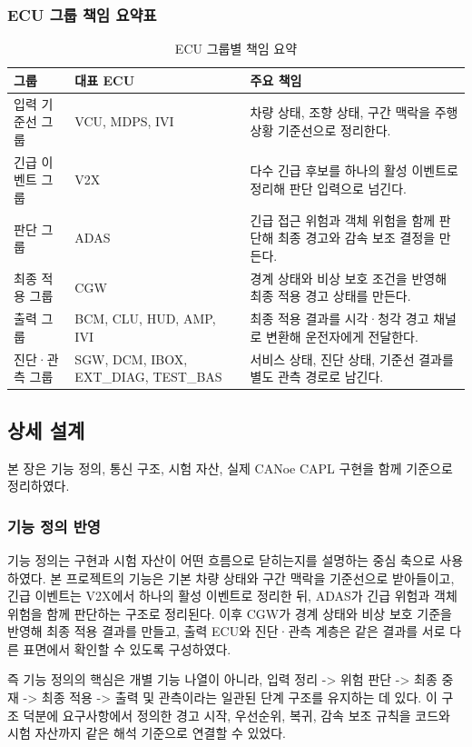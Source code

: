 \documentclass[11pt,a4paper]{article}
\begin{document}
\subsubsection{ECU 그룹 책임 요약표}
\begin{table}[H]
\centering
\begin{tabularx}{\textwidth}{|p{28mm}|p{24mm}|X|}
\hline
\textbf{그룹} & \textbf{대표 ECU} & \textbf{주요 책임} \\ \hline
입력 기준선 그룹 & VCU, MDPS, IVI & 차량 상태, 조향 상태, 구간 맥락을 주행 상황 기준선으로 정리한다. \\ \hline
긴급 이벤트 그룹 & V2X & 다수 긴급 후보를 하나의 활성 이벤트로 정리해 판단 입력으로 넘긴다. \\ \hline
판단 그룹 & ADAS & 긴급 접근 위험과 객체 위험을 함께 판단해 최종 경고와 감속 보조 결정을 만든다. \\ \hline
최종 적용 그룹 & CGW & 경계 상태와 비상 보호 조건을 반영해 최종 적용 경고 상태를 만든다. \\ \hline
출력 그룹 & BCM, CLU, HUD, AMP, IVI & 최종 적용 결과를 시각·청각 경고 채널로 변환해 운전자에게 전달한다. \\ \hline
진단·관측 그룹 & SGW, DCM, IBOX, EXT\_DIAG, TEST\_BAS & 서비스 상태, 진단 상태, 기준선 결과를 별도 관측 경로로 남긴다. \\ \hline
\end{tabularx}
\caption{ECU 그룹별 책임 요약}
\end{table}

\subsection{상세 설계}
본 장은 기능 정의, 통신 구조, 시험 자산, 실제 CANoe CAPL 구현을 함께 기준으로 정리하였다.

\subsubsection{기능 정의 반영}
기능 정의는 구현과 시험 자산이 어떤 흐름으로 닫히는지를 설명하는 중심 축으로 사용하였다. 본 프로젝트의 기능은 기본 차량 상태와 구간 맥락을 기준선으로 받아들이고, 긴급 이벤트는 V2X에서 하나의 활성 이벤트로 정리한 뒤, ADAS가 긴급 위험과 객체 위험을 함께 판단하는 구조로 정리된다. 이후 CGW가 경계 상태와 비상 보호 기준을 반영해 최종 적용 결과를 만들고, 출력 ECU와 진단·관측 계층은 같은 결과를 서로 다른 표면에서 확인할 수 있도록 구성하였다.

즉 기능 정의의 핵심은 개별 기능 나열이 아니라, 입력 정리 -> 위험 판단 -> 최종 중재 -> 최종 적용 -> 출력 및 관측이라는 일관된 단계 구조를 유지하는 데 있다. 이 구조 덕분에 요구사항에서 정의한 경고 시작, 우선순위, 복귀, 감속 보조 규칙을 코드와 시험 자산까지 같은 해석 기준으로 연결할 수 있었다.
\end{document}
